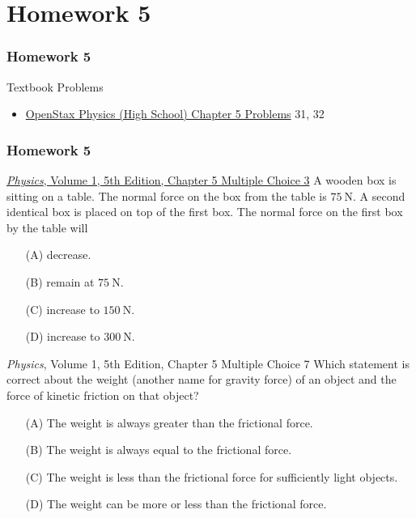 \documentclass[20pt]{beamer}
\begin{document}
\section{Homework 5}

\begin{frame}
	\frametitle{Homework 5}
	\begin{block}{Textbook Problems}
		\begin{itemize}
			\item \href{https://openstax.org/books/physics/pages/5-problems}{OpenStax Physics (High School) Chapter 5 Problems} 31, 32
		\end{itemize}
	\end{block}
\end{frame}

\begin{frame}
	\frametitle{Homework 5}
	\begin{block}{\href{https://www.wiley.com/en-us/Physics\%2C+Volume+1\%2C+5th+Edition-p-9780471320579}{\textit{Physics}, Volume 1, 5th Edition, Chapter 5 Multiple Choice 3}}
		A wooden box is sitting on a table. The normal force on the box from the table is $\SI{75}{\newton}$. A second identical box is placed on top of the first box. The normal force on the first box by the table will
		\begin{enumerate}
			\item[(A)] decrease.
			\item[(B)] remain at $\SI{75}{\newton}$.
			\item[(C)] increase to $\SI{150}{\newton}$.
			\item[(D)] increase to $\SI{300}{\newton}$.
		\end{enumerate}
	\end{block}
	\begin{block}{\textit{Physics}, Volume 1, 5th Edition, Chapter 5 Multiple Choice 7}
		Which statement is correct about the weight (another name for gravity force) of an object and the force of kinetic friction on that object?
		\begin{enumerate}
			\item[(A)] The weight is always greater than the frictional force.
			\item[(B)] The weight is always equal to the frictional force.
			\item[(C)] The weight is less than the frictional force for sufficiently light objects.
			\item[(D)] The weight can be more or less than the frictional force.
		\end{enumerate}
	\end{block}
\end{frame}
\end{document}
